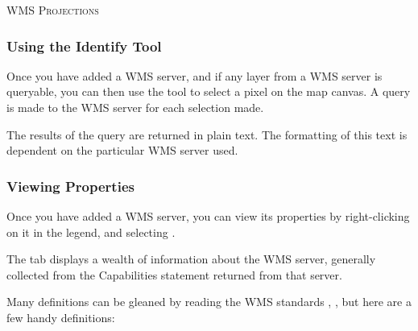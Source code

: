 \begin{Tip}[ht]\caption{\textsc{WMS Projections}}
\end{Tip}


\subsubsection{Using the Identify Tool}\label{sec:ogc-wms-identify}

Once you have added a WMS server, 
and if any layer from a WMS server is queryable, you can then use
the  tool to select a pixel on the map canvas.
A query is made to the WMS server for each selection made.

The results of the query are returned in plain text.
The formatting of this text is dependent on the particular
WMS server used.


\subsubsection{Viewing Properties}\label{sec:ogc-wms-properties}

Once you have added a WMS server, you can view its properties
by right-clicking on it in the legend, and selecting
.


\label{sec:ogc-wms-properties-metadata}

The  tab displays a wealth of information about the WMS server,
generally collected from the Capabilities statement returned from
that server.

Many definitions can be gleaned by reading the WMS
standards \cite{OGCWMS010101web}, \cite{OGCWMS010300web}, but
here are a few handy definitions:

